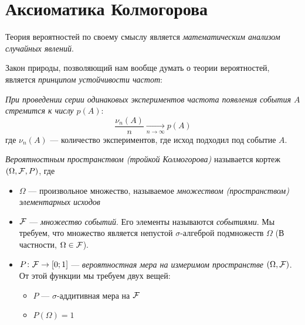 \section{Аксиоматика Колмогорова}

\begin{note}
	Теория вероятностей по своему смыслу является \textit{математическим анализом случайных явлений}.
\end{note}

\begin{reminder}
	Закон природы, позволяющий нам вообще думать о теории вероятностей, является \textit{принципом устойчивости частот}:
	
	\textit{При проведении серии одинаковых экспериментов частота появления события $A$ стремится к числу $p(A)$}:
	\[
		\frac{\nu_n(A)}{n} \xrightarrow[n \to \infty]{} p(A)
	\]
	где $\nu_n(A)$ --- количество экспериментов, где исход подходил под событие $A$.
\end{reminder}

\begin{definition}
	\textit{Вероятностным пространством (тройкой Колмогорова)} называется кортеж $(\Omega, \mathcal{F}, P)$, где
	\begin{itemize}
		\item $\Omega$ --- произвольное множество, называемое \textit{множеством (пространством) элементарных исходов}
		
		\item $\mathcal{F}$ --- \textit{множество событий}. Его элементы называются \textit{событиями}. Мы требуем, что множество является непустой $\sigma$-алгеброй подмножеств $\Omega$ (В частности, $\Omega \in \mathcal{F}$).
		
		\item $P \colon \mathcal{F} \to [0; 1]$ --- \textit{вероятностная мера на измеримом пространстве} $(\Omega, \mathcal{F})$. От этой функции мы требуем двух вещей:
		\begin{itemize}
			\item $P$ --- $\sigma$-аддитивная мера на $\mathcal{F}$
			
			\item $P(\Omega) = 1$
		\end{itemize}
	\end{itemize}
\end{definition}

